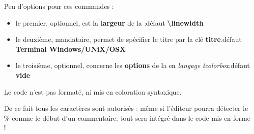 \documentclass{article}
\newcommand\ctex[1]{\tcbox[vignettelatex]{#1}}
\newcommand\Cle[1]{{\bfseries\sffamily\textlangle #1\textrangle}}
\begin{document}
\begin{codecles}
Peu d'options pour ces commandes :

\begin{itemize}
	\item le premier, optionnel, est la \Cle{largeur} de la \ctex{tcbox} ;\hfill{}défaut \Cle{\textbackslash linewidth}
	\item le deuxième, mandataire, permet de spécifier le titre par la clé \Cle{titre}.\hfill{}défaut \Cle{Terminal Windows/UNiX/OSX}
	\item le troisième, optionnel, concerne les \Cle{options} de la \ctex{tcbox} en \textit{langage tcolorbox}.\hfill{}défaut \Cle{vide}
\end{itemize}
\end{codecles}

\begin{codeinfo}
Le \textsf{code} n'est pas formaté, ni mis en coloration syntaxique.

De ce fait tous les caractères sont autorisés : même si l'éditeur pourra détecter le \% comme le début d'un commentaire, tout sera intégré dans le code mis en forme !
\end{codeinfo}


\begin{codesortie}
\end{codesortie}
\end{document}
